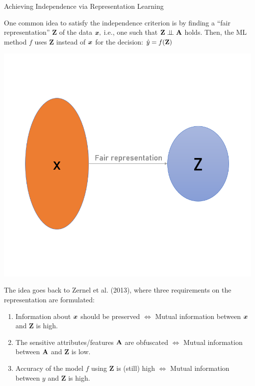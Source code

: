 \begin{vbframe}{Achieving Independence via Representation Learning}
	\small{
		\begin{itemize}
			\begin{minipage}{0.5\textwidth}	
%				
			\item One common idea to satisfy the independence criterion is by finding a ``fair representation'' $\mathbf{Z}$ of the data $\bm{x},$ i.e., one such that $ \mathbf{Z} \perp \!\!\! \perp \mathbf{A}$ holds.
%			
			Then, the ML method $f$ uses $\mathbf{Z}$ instead of $\bm{x}$ for the decision: $\hat{y} = f(\mathbf{Z})$
%			
			\end{minipage}
			\begin{minipage}{0.4\textwidth}
				\centering
				\includegraphics[width=0.8\linewidth]{figure/fair_representation.png}
			\end{minipage}
			\item The idea goes back to Zernel et al. (2013), where three requirements on the representation are formulated:
%			
			\begin{enumerate}
				\small
%				
				\item Information about $\bm{x}$ should be preserved $\Leftrightarrow$ Mutual information between $\bm{x}$ and $\mathbf{Z}$ is high.
%				
				\item The sensitive attributes/features $\mathbf{A}$ are obfuscated $\Leftrightarrow$ Mutual information between $\mathbf{A}$ and $\mathbf{Z}$ is low.
%				
				\item Accuracy of the model $f$ using $\mathbf{Z}$ is (still) high $\Leftrightarrow$ Mutual information between $y$ and $\mathbf{Z}$ is high.
%				
			\end{enumerate}
%			
		\end{itemize}
	}
\end{vbframe}


